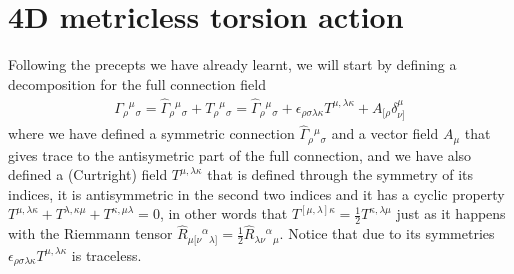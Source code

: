 \documentclass[%
  showpacs,showkeys,prd,superscriptaddress]{revtex4-1}
\begin{document}
\section{4D metricless torsion action}
Following the precepts we have already learnt, we will start by defining a decomposition for the full connection field 
\begin{align}
  \Gamma_{\rho}{}^{\mu}{}_\sigma=\hat\Gamma_{\rho}{}^{\mu}{}_\sigma+T_{\rho}{}^{\mu}{}_\sigma=\hat\Gamma_{\rho}{}^{\mu}{}_\sigma+\epsilon_{\rho\sigma\lambda\kappa}T^{\mu,\lambda\kappa}+A_{[\rho}\delta^\mu_{\nu]}
\end{align}
where we have defined a symmetric connection $\hat\Gamma_{\rho}{}^{\mu}{}_\sigma$ and a vector field $A_\mu$ that gives trace to the antisymetric part of the full connection, and we have also defined a (Curtright) field $T^{\mu,\lambda\kappa}$ that is defined through the symmetry of its indices, it is antisymmetric in the second two indices and it has a cyclic property $T^{\mu,\lambda\kappa}+T^{\lambda,\kappa\mu}+T^{\kappa,\mu\lambda}=0$, in other words that $T^{[\mu,\lambda]\kappa}=\frac{1}{2}T^{\kappa,\lambda\mu}$ just as it happens with the Riemmann tensor $\hat R_{\mu[\nu}{}^\alpha{}_{\lambda]}=\frac{1}{2}\hat R_{\lambda\nu}{}^\alpha{}_{\mu}$. Notice that due to its symmetries $\epsilon_{\rho\sigma\lambda\kappa}T^{\mu,\lambda\kappa}$ is traceless. 
\end{document}
